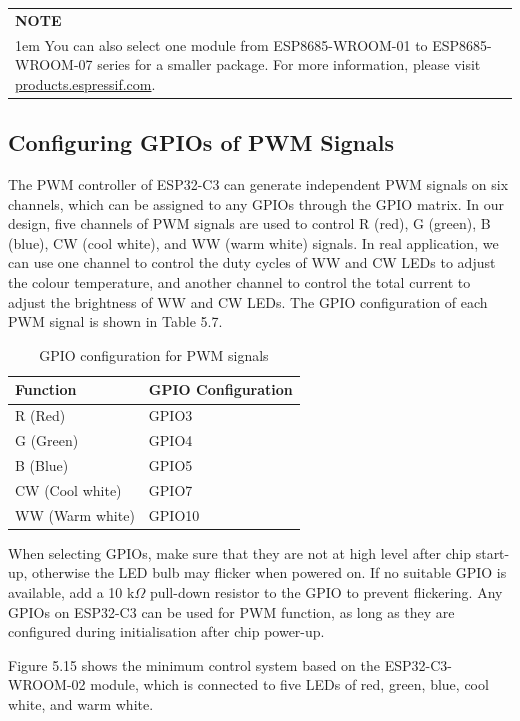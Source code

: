 \documentclass[a4paper,12pt,openany]{book}
\renewcommand{\arraystretch}{1}
\newcommand{\note}[2][NOTE]{ %
\vspace{6pt}
\begin{tabular}{b{\textwidth}}
\hline
\fontfamily{phv}\selectfont \textbf{#1}\\
\leftskip 1em #2\\
\hline
\end{tabular}
}
\begin{document}
\note{You can also select one module from ESP8685-WROOM-01 to ESP8685-WROOM-07 series for a smaller package. For more information, please visit \href{https://products.espressif.com/\#/}{products.espressif.com}.}

\subsection{Configuring GPIOs of PWM Signals}
The PWM controller of ESP32-C3 can generate independent PWM signals on six channels, which can be assigned to any GPIOs through the GPIO matrix. In our design, five channels of PWM signals are used to control R (red), G (green), B (blue), CW (cool white), and WW (warm white) signals. In real application, we can use one channel to control the duty cycles of WW and CW LEDs to adjust the colour temperature, and another channel to control the total current to adjust the brightness of WW and CW LEDs. The GPIO configuration of each PWM signal is shown in Table 5.7.

\begin{table}[h!]
    \renewcommand{\arraystretch}{1.4}
    \caption{GPIO configuration for PWM signals}
    \begin{tabular}{|>{\Centering}m{}|>{\Centering}m{}|}
        \hline
        \rowcolor{LightBlue} \textbf{Function}&\textbf{GPIO Configuration}\\
        \hline
        R (Red)&GPIO3\\
        \hline
        G (Green)&GPIO4\\
        \hline
        B (Blue)&GPIO5\\
        \hline
        CW (Cool white)&GPIO7\\
        \hline
        WW (Warm white)&GPIO10\\
        \hline
    \end{tabular}
\end{table}

When selecting GPIOs, make sure that they are not at high level after chip start-up, otherwise the LED bulb may flicker when powered on. If no suitable GPIO is available, add a 10 k$\Omega$ pull-down resistor to the GPIO to prevent flickering. Any GPIOs on ESP32-C3 can be used for PWM function, as long as they are configured during initialisation after chip power-up.

Figure 5.15 shows the minimum control system based on the ESP32-C3-WROOM-02 module, which is connected to five LEDs of red, green, blue, cool white, and warm white.
\end{document}
